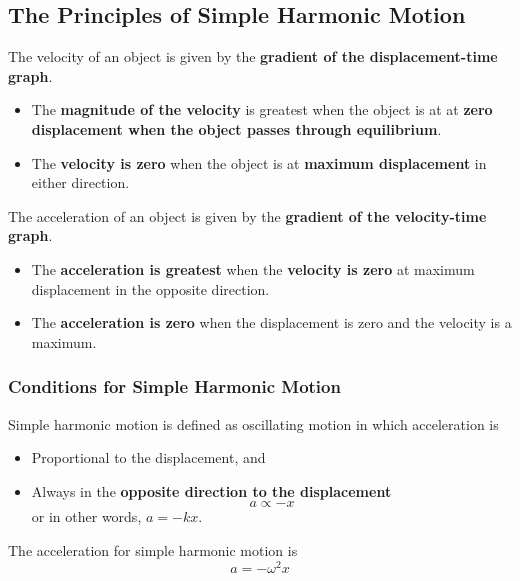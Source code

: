 \subsection{The Principles of Simple Harmonic Motion}

The velocity of an object is given by the \textbf{gradient of the displacement-time graph}.
\begin{itemize}
    \item The \textbf{magnitude of the velocity} is greatest when the object is at at \textbf{zero displacement when the object passes through equilibrium}.
    \item The \textbf{velocity is zero} when the object is at \textbf{maximum displacement} in either direction.
\end{itemize}

The acceleration of an object is given by the \textbf{gradient of the velocity-time graph}.
\begin{itemize}
    \item The \textbf{acceleration is greatest} when the \textbf{velocity is zero} at maximum displacement in the opposite direction.
    \item The \textbf{acceleration is zero} when the displacement is zero and the velocity is a maximum.
\end{itemize}

\subsubsection*{Conditions for Simple Harmonic Motion}

Simple harmonic motion is defined as oscillating motion in which acceleration is
\begin{itemize}
    \item Proportional to the displacement, and
    \item Always in the \textbf{opposite direction to the displacement}
        $$a\propto-x$$
        or in other words, $a=-kx$.
\end{itemize}

The acceleration for simple harmonic motion is
$$a=-\omega^2x$$
